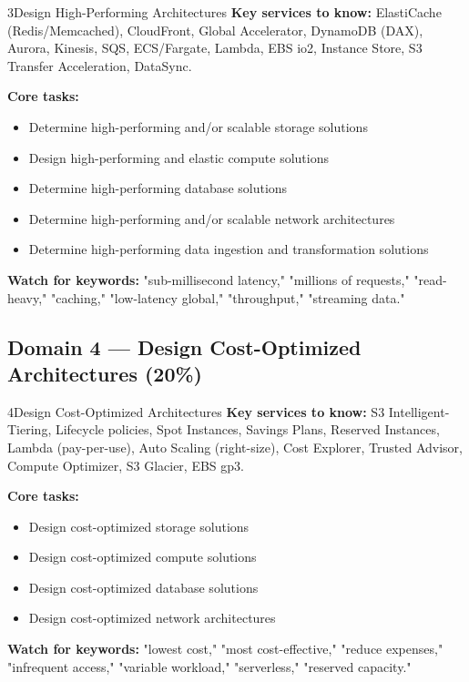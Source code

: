 \begin{domainsummary}{3}{Design High-Performing Architectures}
\textbf{Key services to know:} ElastiCache (Redis/Memcached), CloudFront, Global
Accelerator, DynamoDB (DAX), Aurora, Kinesis, SQS, ECS/Fargate, Lambda, EBS io2,
Instance Store, S3 Transfer Acceleration, DataSync.

\textbf{Core tasks:}
\begin{itemize}
  \item Determine high-performing and/or scalable storage solutions
  \item Design high-performing and elastic compute solutions
  \item Determine high-performing database solutions
  \item Determine high-performing and/or scalable network architectures
  \item Determine high-performing data ingestion and transformation solutions
\end{itemize}

\textbf{Watch for keywords:} "sub-millisecond latency," "millions of requests,"
"read-heavy," "caching," "low-latency global," "throughput," "streaming data."
\end{domainsummary}

\subsection{Domain 4 — Design Cost-Optimized Architectures (20\%)}

\begin{domainsummary}{4}{Design Cost-Optimized Architectures}
\textbf{Key services to know:} S3 Intelligent-Tiering, Lifecycle policies, Spot Instances,
Savings Plans, Reserved Instances, Lambda (pay-per-use), Auto Scaling (right-size),
Cost Explorer, Trusted Advisor, Compute Optimizer, S3 Glacier, EBS gp3.

\textbf{Core tasks:}
\begin{itemize}
  \item Design cost-optimized storage solutions
  \item Design cost-optimized compute solutions
  \item Design cost-optimized database solutions
  \item Design cost-optimized network architectures
\end{itemize}

\textbf{Watch for keywords:} "lowest cost," "most cost-effective," "reduce expenses,"
"infrequent access," "variable workload," "serverless," "reserved capacity."
\end{domainsummary}

